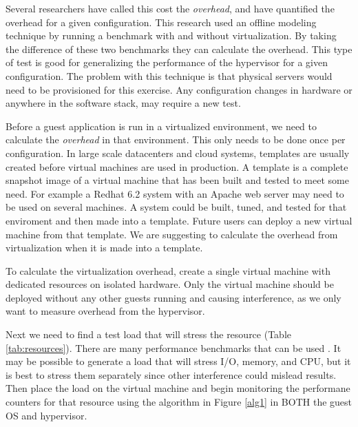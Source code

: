\indent Several researchers \cite{cherkasova, huber1} have called this cost the \emph{overhead}, and have quantified the overhead for a given configuration.  This research used an offline modeling technique by running a benchmark with and without virtualization.  By taking the difference of these two benchmarks they can calculate the overhead.
This type of test is good for generalizing the performance of the hypervisor for a given configuration.
The problem with this technique is that physical servers would need to be provisioned for this exercise.  Any configuration changes in hardware or anywhere in the software stack, may require a new test.  

\indent Before a guest application is run in a virtualized environment, we need to calculate the \emph{overhead} in that environment.  This only needs to be done once per configuration.  In large scale datacenters and cloud systems, templates are usually created before virtual machines are used in production.  A template is a complete snapshot image of a virtual machine that has been built and tested to meet some need.  For example a Redhat 6.2 system with an Apache web server may need to be used on several machines.  A system could be built, tuned, and tested for that enviroment and then made into a template.  Future users can deploy a new virtual machine from that template.  We are suggesting to calculate the overhead from virtualization when it is made into a template.  

\indent To calculate the virtualization overhead, create a single virtual machine with dedicated resources on isolated hardware.  
Only the virtual machine should be deployed without any other guests running and causing interference, as we only want to measure overhead from the hypervisor.  

\indent Next we need to find a test load that will stress the resource (Table \ref{tab:resources}).   
There are many performance benchmarks that can be used \cite{katcher, tikotekar, hplBench}. 
It may be possible to generate a load that will stress I/O, memory, and CPU, but it is best to stress them separately since other interference could mislead results.  
Then place the load on the virtual machine and begin monitoring the performane counters for that resource using the algorithm in Figure \ref{alg1} in BOTH the guest OS and hypervisor. 

